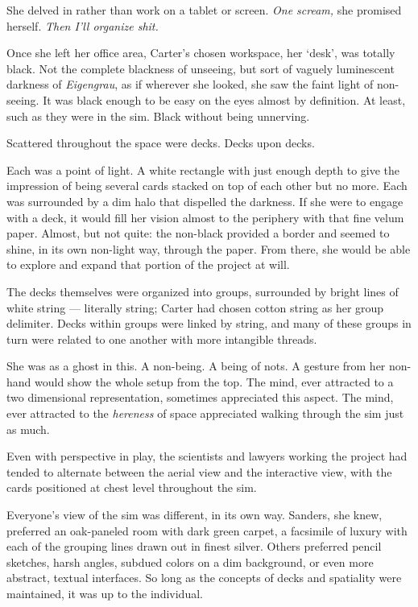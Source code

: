 She delved in rather than work on a tablet or screen. \emph{One scream,} she promised herself. \emph{Then I'll organize shit.}

Once she left her office area, Carter's chosen workspace, her `desk', was totally black. Not the complete blackness of unseeing, but sort of vaguely luminescent darkness of \emph{Eigengrau}, as if wherever she looked, she saw the faint light of non-seeing. It was black enough to be easy on the eyes almost by definition. At least, such as they were in the sim. Black without being unnerving.

Scattered throughout the space were decks. Decks upon decks.

Each was a point of light. A white rectangle with just enough depth to give the impression of being several cards stacked on top of each other but no more. Each was surrounded by a dim halo that dispelled the darkness. If she were to engage with a deck, it would fill her vision almost to the periphery with that fine velum paper. Almost, but not quite: the non-black provided a border and seemed to shine, in its own non-light way, through the paper. From there, she would be able to explore and expand that portion of the project at will.

The decks themselves were organized into groups, surrounded by bright lines of white string — literally string; Carter had chosen cotton string as her group delimiter. Decks within groups were linked by string, and many of these groups in turn were related to one another with more intangible threads.

She was as a ghost in this. A non-being. A being of nots. A gesture from her non-hand would show the whole setup from the top. The mind, ever attracted to a two dimensional representation, sometimes appreciated this aspect. The mind, ever attracted to the \emph{hereness} of space appreciated walking through the sim just as much.

Even with perspective in play, the scientists and lawyers working the project had tended to alternate between the aerial view and the interactive view, with the cards positioned at chest level throughout the sim.

Everyone's view of the sim was different, in its own way. Sanders, she knew, preferred an oak-paneled room with dark green carpet, a facsimile of luxury with each of the grouping lines drawn out in finest silver. Others preferred pencil sketches, harsh angles, subdued colors on a dim background, or even more abstract, textual interfaces. So long as the concepts of decks and spatiality were maintained, it was up to the individual.

